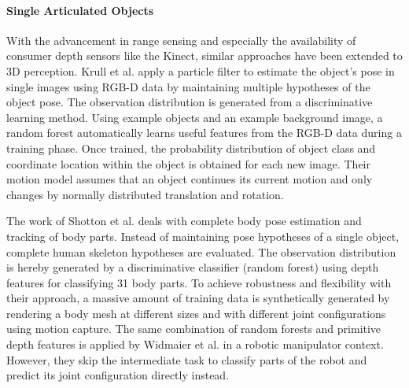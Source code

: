 \paragraph{Single Articulated Objects}
With the advancement in range sensing and especially the availability of consumer depth sensors like the Kinect, similar approaches have been extended to 3D perception. Krull et al. \cite{Krull2015} apply a particle filter to estimate the object's pose in single images using RGB-D data by maintaining multiple hypotheses of the object pose. The observation distribution is generated from a discriminative learning method. Using example objects and an example background image, a random forest automatically learns useful features from the RGB-D data during a training phase. Once trained, the probability distribution of object class and coordinate location within the object is obtained for each new image. Their motion model assumes that an object continues its current motion and only changes by normally distributed translation and rotation.

The work of Shotton et al. \cite{Shotton2013} deals with complete body pose estimation and tracking of body parts. Instead of maintaining pose hypotheses of a single object, complete human skeleton hypotheses are evaluated. The observation distribution is hereby generated by a discriminative classifier (random forest) using depth features for classifying 31 body parts. To achieve robustness and flexibility with their approach, a massive amount of training data is synthetically generated by rendering a body mesh at different sizes and with different joint configurations using motion capture.
The same combination of random forests and primitive depth features is applied by Widmaier et al. \cite{Widmaier2016} in a robotic manipulator context. However, they skip the intermediate task to classify parts of the robot and predict its joint configuration directly instead.


